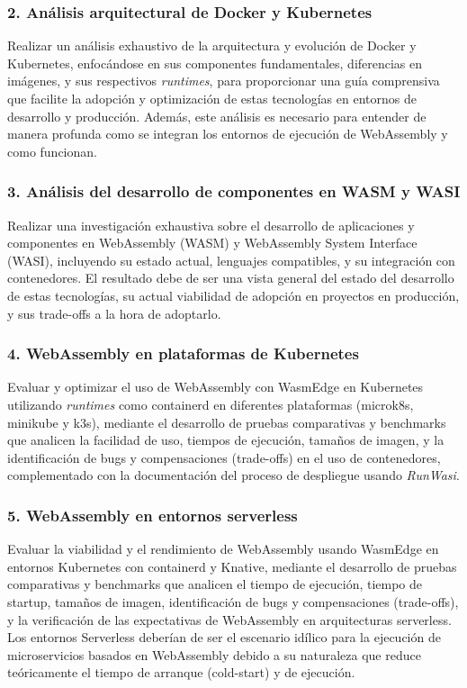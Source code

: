 \subsubsection{2. Análisis arquitectural de Docker y Kubernetes}

Realizar un análisis exhaustivo de la arquitectura y evolución de Docker y Kubernetes, enfocándose en sus componentes fundamentales, diferencias en imágenes, y sus respectivos \textit{runtimes}, para proporcionar una guía comprensiva que facilite la adopción y optimización de estas tecnologías en entornos de desarrollo y producción. Además, este análisis es necesario para entender de manera profunda como se integran los entornos de ejecución de WebAssembly y como funcionan.

\subsubsection{3. Análisis del desarrollo de componentes en WASM y WASI}

Realizar una investigación exhaustiva sobre el desarrollo de aplicaciones y componentes en WebAssembly (WASM) y WebAssembly System Interface (WASI), incluyendo su estado actual, lenguajes compatibles, y su integración con contenedores. El resultado debe de ser una vista general del estado del desarrollo de estas tecnologías, su actual viabilidad de adopción en proyectos en producción, y sus trade-offs a la hora de adoptarlo.

\subsubsection{4. WebAssembly en plataformas de Kubernetes}

Evaluar y optimizar el uso de WebAssembly con WasmEdge en Kubernetes utilizando \textit{runtimes} como containerd en diferentes plataformas (microk8s, minikube y k3s), mediante el desarrollo de pruebas comparativas y benchmarks que analicen la facilidad de uso, tiempos de ejecución, tamaños de imagen, y la identificación de bugs y compensaciones (trade-offs) en el uso de contenedores, complementado con la documentación del proceso de despliegue usando \textit{RunWasi}.

\subsubsection{5. WebAssembly en entornos serverless}

Evaluar la viabilidad y el rendimiento de WebAssembly usando WasmEdge en entornos Kubernetes con containerd y Knative, mediante el desarrollo de pruebas comparativas y benchmarks que analicen el tiempo de ejecución, tiempo de startup, tamaños de imagen, identificación de bugs y compensaciones (trade-offs), y la verificación de las expectativas de WebAssembly en arquitecturas serverless. Los entornos Serverless deberían de ser el escenario idílico para la ejecución de microservicios basados en WebAssembly debido a su naturaleza que reduce teóricamente el tiempo de arranque (cold-start) y de ejecución.

